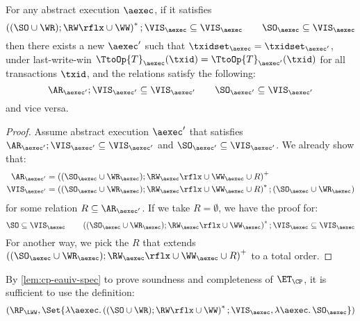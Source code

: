 \begin{lemma}
    \label{lem:cp-eauiv-spec}
    For any abstract execution \( \aexec \),
    if it satisfies 
    \[
        \left( (\SO \cup \WR ) ; \RW\rflx \cup \WW \right)^* ; \VIS_\aexec \subseteq \VIS_\aexec 
        \qquad \SO_\aexec \subseteq \VIS_\aexec
    \]
    then there exists a new \( \aexec' \) such that \( \txidset_\aexec = \txidset_{\aexec'} \), 
    under last-write-win \( \TtoOp{T}_{\aexec}(\txid) = \TtoOp{T}_{\aexec'}(\txid) \) for all transactions \( \txid \),
    and the relations satisfy the following:
    \[ 
        \AR_{\aexec'} ; \VIS_{\aexec'} \subseteq \VIS_{\aexec'}  \qquad \SO_{\aexec'} \subseteq \VIS_{\aexec'}
    \]
    and vice versa.
\end{lemma}
\begin{proof}
Assume abstract execution \( \aexec' \) that satisfies \( \AR_{\aexec'} ; \VIS_{\aexec'} \subseteq \VIS_{\aexec'} \)
and  \( \SO_{\aexec'} \subseteq \VIS_{\aexec'} \).
We already show that:
\begin{align*}
    \AR_{\aexec'} & = \left( (\SO_\aexec \cup \WR_\aexec ) ; \RW_\aexec\rflx \cup \WW_\aexec \cup R \right)^+ \\
    \VIS_{\aexec'} & = \left( (\SO_\aexec \cup \WR_\aexec ) ; \RW_\aexec\rflx \cup \WW_\aexec \cup R \right)^* ; (\SO_\aexec \cup \WR_\aexec )
\end{align*}
for some relation \( R \subseteq \AR_{\aexec'} \).
If we take \( R  = \emptyset \), we have the proof for:
\[
        \SO \subseteq \VIS_\aexec \qquad 
        \left( (\SO_\aexec \cup \WR_\aexec ) ; \RW_\aexec\rflx \cup \WW_\aexec \right)^* ; \VIS_\aexec \subseteq \VIS_\aexec
\]
For another way, we pick the \( R \) that extends
\( \left( (\SO_\aexec \cup \WR_\aexec ) ; \RW_\aexec\rflx \cup \WW_\aexec \cup R \right)^+ \) 
to a total order.
\end{proof}

By \cref{lem:cp-eauiv-spec} to prove soundness and completeness of \( \ET_\CP \), it is sufficient to use the definition:
\[
    (\RP_{\LWW}, \Set{\lambda \aexec. \left( (\SO \cup \WR ) ; \RW\rflx \cup \WW \right)^* ; \VIS_\aexec, \lambda \aexec \ldotp \SO_\aexec }) 
\]

